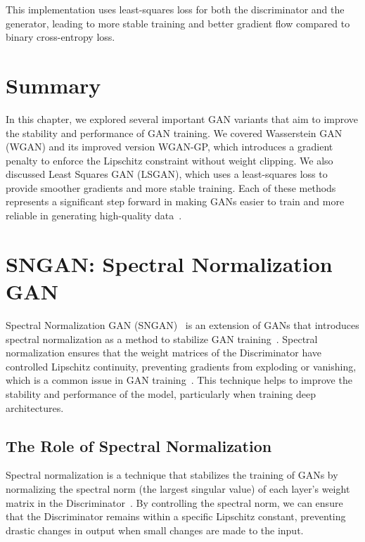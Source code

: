 This implementation uses least-squares loss for both the discriminator and the generator, leading to more stable training and better gradient flow compared to binary cross-entropy loss.

\section{Summary}
In this chapter, we explored several important GAN variants that aim to improve the stability and performance of GAN training. We covered Wasserstein GAN (WGAN) and its improved version WGAN-GP, which introduces a gradient penalty to enforce the Lipschitz constraint without weight clipping. We also discussed Least Squares GAN (LSGAN), which uses a least-squares loss to provide smoother gradients and more stable training. Each of these methods represents a significant step forward in making GANs easier to train and more reliable in generating high-quality data~\cite{goodfellow2014generative}.










\section{SNGAN: Spectral Normalization GAN}
Spectral Normalization GAN (SNGAN)~\cite{miyato2018spectral} is an extension of GANs that introduces spectral normalization as a method to stabilize GAN training~\cite{lin2021spectral}. Spectral normalization ensures that the weight matrices of the Discriminator have controlled Lipschitz continuity, preventing gradients from exploding or vanishing, which is a common issue in GAN training~\cite{miyato2018spectral}. This technique helps to improve the stability and performance of the model, particularly when training deep architectures.

\subsection{The Role of Spectral Normalization}
Spectral normalization is a technique that stabilizes the training of GANs by normalizing the spectral norm (the largest singular value) of each layer's weight matrix in the Discriminator~\cite{farnia2018generalizable}. By controlling the spectral norm, we can ensure that the Discriminator remains within a specific Lipschitz constant, preventing drastic changes in output when small changes are made to the input.

